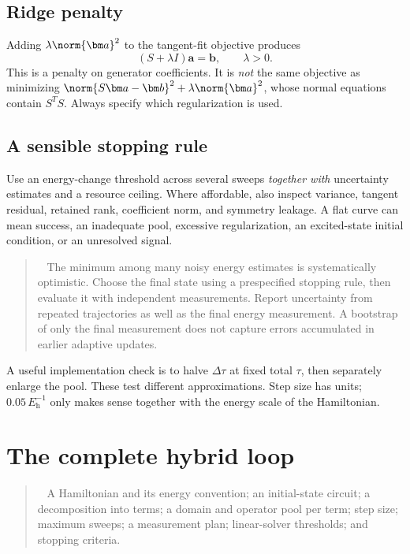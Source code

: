 \documentclass[11pt,a4paper]{article}
\newcommand{\dt}{\Delta\tau}
\newcommand{\Eh}{E_{\mathrm h}}
\newcommand{\lesson}[2]{\clearpage\section{#1}\label{#2}}
\newenvironment{idea}[1][Main idea]{\par\smallskip\begin{quotation}\noindent{\bfseries\textcolor{keyblue}{#1.}}\ }{\end{quotation}\smallskip}
\newenvironment{caution}[1][Important distinction]{\par\smallskip\begin{quotation}\noindent{\bfseries\textcolor{alertred}{#1.}}\ }{\end{quotation}\smallskip}
\begin{document}
\subsection*{Ridge penalty}
Adding $\lambda\norm{\bm a}^2$ to the tangent-fit objective produces
\[
(S+\lambda I)\bm a=\bm b,\qquad\lambda>0.
\]
This is a penalty on generator coefficients. It is \emph{not} the same objective as minimizing $\norm{S\bm a-\bm b}^2+\lambda\norm{\bm a}^2$, whose normal equations contain $S^TS$. Always specify which regularization is used.

\subsection*{A sensible stopping rule}
Use an energy-change threshold across several sweeps \emph{together with} uncertainty estimates and a resource ceiling. Where affordable, also inspect variance, tangent residual, retained rank, coefficient norm, and symmetry leakage. A flat curve can mean success, an inadequate pool, excessive regularization, an excited-state initial condition, or an unresolved signal.

\begin{caution}[Avoid selecting the best-looking noisy point]
The minimum among many noisy energy estimates is systematically optimistic. Choose the final state using a prespecified stopping rule, then evaluate it with independent measurements. Report uncertainty from repeated trajectories as well as the final energy measurement. A bootstrap of only the final measurement does not capture errors accumulated in earlier adaptive updates.
\end{caution}

A useful implementation check is to halve $\dt$ at fixed total $\tau$, then separately enlarge the pool. These test different approximations. Step size has units; $0.05\,\Eh^{-1}$ only makes sense together with the energy scale of the Hamiltonian.

\lesson{The complete hybrid loop}{sec:algorithm}
\begin{idea}[Inputs]
A Hamiltonian and its energy convention; an initial-state circuit; a decomposition into terms; a domain and operator pool per term; step size; maximum sweeps; a measurement plan; linear-solver thresholds; and stopping criteria.
\end{idea}
\end{document}
